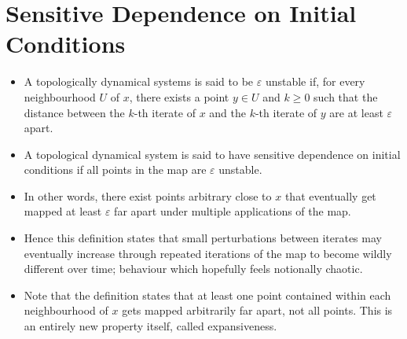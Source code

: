 \documentclass{article}
\begin{document}
    \section{Sensitive Dependence on Initial Conditions}
    \begin{itemize}
        \item A topologically dynamical systems is said to be $\varepsilon$ unstable if, for every neighbourhood $U$ of $x$, there exists a point $y \in U$ and $k \geq 0$ such that the distance between the $k$-th iterate of $x$ and the $k$-th iterate of $y$ are at least $\varepsilon$ apart.
        \item A topological dynamical system is said to have sensitive dependence on initial conditions if all points in the map are $\varepsilon$ unstable.
        \item In other words, there exist points arbitrary close to $x$ that eventually get mapped at least $\varepsilon$ far apart under multiple applications of the map. 
        \item Hence this definition states that small perturbations between iterates may eventually increase through repeated iterations of the map to become wildly different over time; behaviour which hopefully feels notionally chaotic.
        \item Note that the definition states that at least one point contained within each neighbourhood of $x$ gets mapped arbitrarily far apart, not all points. This is an entirely new property itself, called expansiveness.
    \end{itemize}
\end{document}
